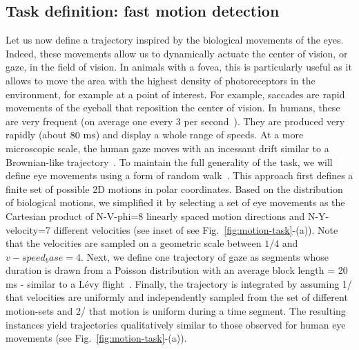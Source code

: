 \documentclass[default]{sn-jnl}%
\theoremstyle{thmstyleone}%
\theoremstyle{thmstyletwo}%
\theoremstyle{thmstylethree}%
\newcommand{\seeFig}[1]{see Fig.~\ref{fig:#1}}%
\begin{document}
\subsection{Task definition: fast motion detection}
%
Let us now define a trajectory inspired by the biological movements of the eyes. Indeed, these movements allow us to dynamically actuate the center of vision, or gaze, in the field of vision. In animals with a fovea, this is particularly useful as it allows to move the area with the highest density of photoreceptors in the environment, for example at a point of interest. For example, saccades are rapid movements of the eyeball that reposition the center of vision. In humans, these are very frequent (on average one every 3 per second~\citep{dandekar_neural_2012}). They are produced very rapidly (about $80~\si{\milli\second}$) and display a whole range of speeds. At a more microscopic scale, the human gaze moves with an incessant drift similar to a Brownian-like trajectory~\citep{poletti_head-eye_2015}. To maintain the full generality of the task, we will define eye movements using a form of random walk~\citep{eng}. This approach first defines a finite set of possible 2D motions in polar coordinates. Based on the distribution of biological motions, we simplified it by selecting a set of eye movements as the Cartesian product of N-V-phi=8 linearly spaced motion directions and N-Y-velocity=7 different velocities (see inset of \seeFig{motion-task}-(a)). Note that the velocities are sampled on a geometric scale between $1/4$ and $v-speed_base = 4$. Next, we define one trajectory of gaze as segments whose duration is drawn from a Poisson distribution with an average block length = 20 ms - similar to a Lévy flight~\citep{}. Finally, the trajectory is integrated by assuming 1/ that velocities are uniformly and independently sampled from the set of different motion-sets and 2/ that motion is uniform during a time segment. The resulting instances yield trajectories qualitatively similar to those observed for human eye movements (\seeFig{motion-task}-(a)).
\end{document}
